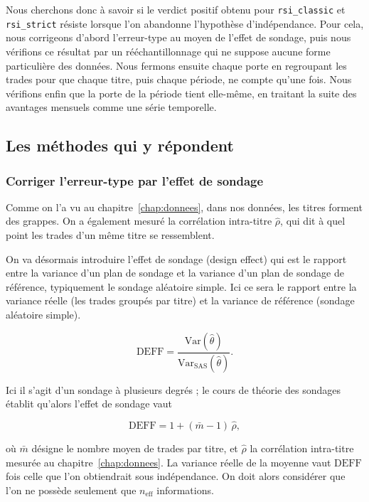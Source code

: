 Nous cherchons donc à savoir si le verdict positif obtenu pour
\texttt{rsi\_classic} et \texttt{rsi\_strict} résiste lorsque l'on abandonne
l'hypothèse d'indépendance. 
Pour cela, nous corrigeons d'abord l'erreur-type
au moyen de l'effet de sondage, puis nous vérifions ce résultat par un
rééchantillonnage qui ne suppose aucune forme particulière des données. Nous
fermons ensuite chaque porte en regroupant les trades pour que chaque titre,
puis chaque période, ne compte qu'une fois. Nous vérifions enfin que la porte
de la période tient elle-même, en traitant la suite des avantages mensuels
comme une série temporelle.

\subsection{Les méthodes qui y répondent}

\subsubsection*{Corriger l'erreur-type par l'effet de sondage}

Comme on l'a vu au chapitre~\ref{chap:donnees}, dans nos données, les titres
forment des grappes. On a également mesuré la corrélation intra-titre
$\hat\rho$, qui dit à quel point les trades d'un même titre se ressemblent.

On va désormais introduire l'effet de sondage (design effect) qui est le rapport
entre la variance d'un plan de sondage et la variance d'un plan de sondage de
référence, typiquement le sondage aléatoire simple.
Ici ce sera le rapport entre la variance réelle (les trades groupés par titre)
et la variance de référence (sondage aléatoire simple).

\[
  \mathrm{DEFF}
    = \frac{\mathrm{Var}(\hat\theta)}{\mathrm{Var}_{\mathrm{SAS}}(\hat\theta)} .
\]

Ici il s'agit d'un sondage à plusieurs degrés ; le cours de théorie des
sondages établit qu'alors l'effet de sondage vaut

\[
  \mathrm{DEFF} = 1 + (\bar m - 1)\,\hat\rho ,
\]

où $\bar m$ désigne le nombre moyen de trades par titre, et $\hat\rho$ la
corrélation intra-titre mesurée au chapitre~\ref{chap:donnees}.
La variance réelle de la moyenne vaut $\mathrm{DEFF}$ fois celle que l'on
obtiendrait sous indépendance. On doit alors considérer que l'on ne possède
seulement que $n_{\mathrm{eff}}$ informations.


